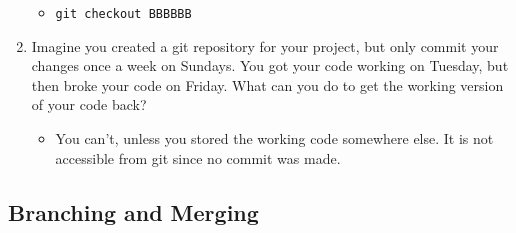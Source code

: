 \documentclass[10pt,twocolumn]{article}
\begin{document}
\begin{enumerate}
        \begin{itemize}
            \item \texttt{git checkout BBBBBB}
        \end{itemize}
    \item Imagine you created a git repository for your project, but only commit your changes once a week on Sundays. You got your code working on Tuesday, but then broke your code on Friday. What can you do to get the working version of your code back?
        \begin{itemize}
            \item You can't, unless you stored the working code somewhere else. It is not accessible from git since no commit was made.
        \end{itemize}
\end{enumerate}

\subsection{Branching and Merging}
\end{document}
